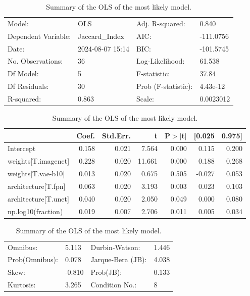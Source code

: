 \begin{table}
\caption{Summary of the OLS of the most likely model.}
\label{tab:data_fraction_parameter_influence_full}
\begin{center}
\begin{tabular}{llll}
\hline
Model:              & OLS              & Adj. R-squared:     & 0.840      \\
Dependent Variable: & Jaccard\_Index   & AIC:                & -111.0756  \\
Date:               & 2024-08-07 15:14 & BIC:                & -101.5745  \\
No. Observations:   & 36               & Log-Likelihood:     & 61.538     \\
Df Model:           & 5                & F-statistic:        & 37.84      \\
Df Residuals:       & 30               & Prob (F-statistic): & 4.43e-12   \\
R-squared:          & 0.863            & Scale:              & 0.0023012  \\
\hline
\end{tabular}
\end{center}

\begin{center}
\begin{tabular}{lrrrrrr}
\hline
                     & Coef. & Std.Err. &      t & P$> |$t$|$ & [0.025 & 0.975]  \\
\hline
Intercept            & 0.158 &    0.021 &  7.564 &       0.000 &  0.115 &  0.200  \\
weights[T.imagenet]  & 0.228 &    0.020 & 11.661 &       0.000 &  0.188 &  0.268  \\
weights[T.vae-b10]   & 0.013 &    0.020 &  0.675 &       0.505 & -0.027 &  0.053  \\
architecture[T.fpn]  & 0.063 &    0.020 &  3.193 &       0.003 &  0.023 &  0.103  \\
architecture[T.unet] & 0.040 &    0.020 &  2.050 &       0.049 &  0.000 &  0.080  \\
np.log10(fraction)   & 0.019 &    0.007 &  2.706 &       0.011 &  0.005 &  0.034  \\
\hline
\end{tabular}
\end{center}

\begin{center}
\begin{tabular}{llll}
\hline
Omnibus:       & 5.113  & Durbin-Watson:    & 1.446  \\
Prob(Omnibus): & 0.078  & Jarque-Bera (JB): & 4.038  \\
Skew:          & -0.810 & Prob(JB):         & 0.133  \\
Kurtosis:      & 3.265  & Condition No.:    & 8      \\
\hline
\end{tabular}
\end{center}
\end{table}
\bigskip

